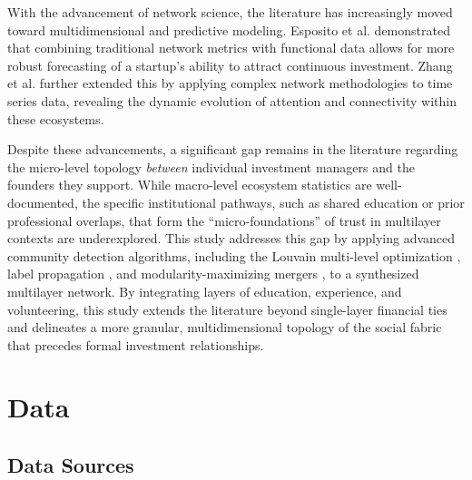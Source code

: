 \documentclass[conference]{IEEEtran}
\begin{document}
With the advancement of network science, the literature has increasingly moved toward multidimensional and predictive modeling. Esposito et al. \cite{esposito2022} demonstrated that combining traditional network metrics with functional data allows for more robust forecasting of a startup's ability to attract continuous investment. Zhang et al. \cite{zhang2020} further extended this by applying complex network methodologies to time series data, revealing the dynamic evolution of attention and connectivity within these ecosystems.

Despite these advancements, a significant gap remains in the literature regarding the micro-level topology \textit{between} individual investment managers and the founders they support. While macro-level ecosystem statistics are well-documented, the specific institutional pathways, such as shared education or prior professional overlaps, that form the ``micro-foundations'' of trust in multilayer contexts are underexplored. This study addresses this gap by applying advanced community detection algorithms, including the Louvain multi-level optimization \cite{blondel2008fast}, label propagation \cite{raghavan2007near}, and modularity-maximizing mergers \cite{clauset2004finding}, to a synthesized multilayer network. By integrating layers of education, experience, and volunteering, this study extends the literature beyond single-layer financial ties \cite{newman2004finding} and delineates a more granular, multidimensional topology of the social fabric that precedes formal investment relationships.

\section{Data}

\subsection{Data Sources}
\end{document}
